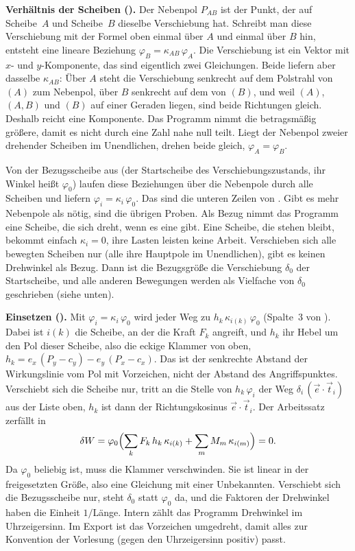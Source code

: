 \textbf{Verhältnis der Scheiben ().} Der Nebenpol $P_{AB}$ ist der Punkt, der auf
Scheibe~$A$ und Scheibe~$B$ dieselbe Verschiebung hat. Schreibt man diese Verschiebung mit der
Formel oben einmal über $A$ und einmal über $B$ hin, entsteht eine lineare Beziehung
$\varphi_B = \kappa_{AB}\,\varphi_A$. Die Verschiebung ist ein Vektor mit $x$- und $y$-Komponente,
das sind eigentlich zwei Gleichungen. Beide liefern aber dasselbe $\kappa_{AB}$: Über $A$ steht die
Verschiebung senkrecht auf dem Polstrahl von $(A)$ zum Nebenpol, über $B$ senkrecht auf dem von
$(B)$, und weil $(A)$, $(A,B)$ und $(B)$ auf einer Geraden liegen, sind beide Richtungen gleich.
Deshalb reicht eine Komponente. Das Programm nimmt die betragsmäßig größere, damit es nicht durch
eine Zahl nahe null teilt. Liegt der Nebenpol zweier drehender Scheiben im Unendlichen, drehen beide
gleich, $\varphi_A = \varphi_B$.

Von der Bezugsscheibe aus (der Startscheibe des Verschiebungszustands, ihr Winkel heißt
$\varphi_0$) laufen diese Beziehungen über die Nebenpole durch alle Scheiben und liefern
$\varphi_i = \kappa_i\,\varphi_0$. Das sind die unteren Zeilen von . Gibt es mehr
Nebenpole als nötig, sind die übrigen Proben. Als Bezug nimmt das Programm eine Scheibe, die sich
dreht, wenn es eine gibt. Eine Scheibe, die stehen bleibt, bekommt einfach $\kappa_i = 0$, ihre
Lasten leisten keine Arbeit. Verschieben sich alle bewegten Scheiben nur (alle ihre Hauptpole im
Unendlichen), gibt es keinen Drehwinkel als Bezug. Dann ist die Bezugsgröße die Verschiebung $\delta_0$ der Startscheibe, und
alle anderen Bewegungen werden als Vielfache von $\delta_0$ geschrieben (siehe unten).

\textbf{Einsetzen ().} Mit $\varphi_i = \kappa_i\,\varphi_0$ wird jeder Weg zu
$h_k\,\kappa_{i(k)}\,\varphi_0$ (Spalte~3 von ). Dabei ist $i(k)$ die Scheibe, an der
die Kraft $F_k$ angreift, und $h_k$ ihr Hebel um den Pol dieser Scheibe, also die eckige Klammer
von oben, $h_k = e_x\,(P_y - c_y) - e_y\,(P_x - c_x)$. Das ist der senkrechte Abstand der
Wirkungslinie vom Pol mit Vorzeichen, nicht der Abstand des Angriffspunktes. Verschiebt sich die
Scheibe nur, tritt an die Stelle von $h_k\,\varphi_i$ der Weg $\delta_i\,(\vec e\cdot\vec t_i)$ aus
der Liste oben, $h_k$ ist dann der Richtungskosinus $\vec e\cdot\vec t_i$. Der Arbeitssatz zerfällt in
\[
  \delta W = \varphi_0 \Bigl(\sum_k F_k\,h_k\,\kappa_{i(k)} + \sum_m M_m\,\kappa_{i(m)}\Bigr) = 0 .
\]
Da $\varphi_0$ beliebig ist, muss die Klammer verschwinden. Sie ist linear in der freigesetzten
Größe, also eine Gleichung mit einer Unbekannten. Verschiebt sich die Bezugsscheibe nur, steht
$\delta_0$ statt $\varphi_0$ da, und die Faktoren der Drehwinkel haben die Einheit $1/$Länge.
Intern zählt das Programm Drehwinkel im Uhrzeigersinn. Im Export ist das Vorzeichen umgedreht,
damit alles zur Konvention der Vorlesung (gegen den Uhrzeigersinn positiv) passt.

